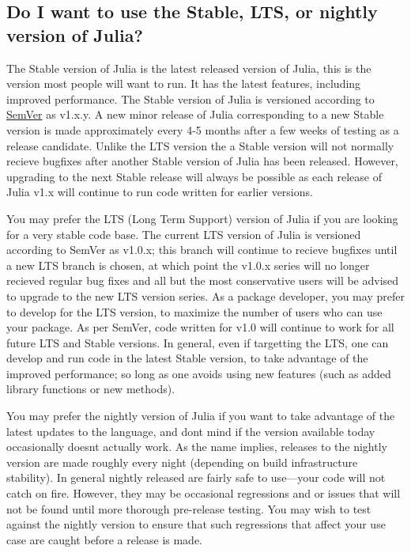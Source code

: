 \hypertarget{15044504752514653644}{}


\subsection{Do I want to use the Stable, LTS, or nightly version of Julia?}



The Stable version of Julia is the latest released version of Julia, this is the version most people will want to run. It has the latest features, including improved performance. The Stable version of Julia is versioned according to \href{https://semver.org/}{SemVer} as v1.x.y. A new minor release of Julia corresponding to a new Stable version is made approximately every 4-5 months after a few weeks of testing as a release candidate. Unlike the LTS version the a Stable version will not normally recieve bugfixes after another Stable version of Julia has been released. However, upgrading to the next Stable release will always be possible as each release of Julia v1.x will continue to run code written for earlier versions.



You may prefer the LTS (Long Term Support) version of Julia if you are looking for a very stable code base. The current LTS version of Julia is versioned according to SemVer as v1.0.x; this branch will continue to recieve bugfixes until a new LTS branch is chosen, at which point the v1.0.x series will no longer recieved regular bug fixes and all but the most conservative users will be advised to upgrade to the new LTS version series. As a package developer, you may prefer to develop for the LTS version, to maximize the number of users who can use your package. As per SemVer, code written for v1.0 will continue to work for all future LTS and Stable versions. In general, even if targetting the LTS, one can develop and run code in the latest Stable version, to take advantage of the improved performance; so long as one avoids using new features (such as added library functions or new methods).



You may prefer the nightly version of Julia if you want to take advantage of the latest updates to the language, and don{\textquotesingle}t mind if the version available today occasionally doesn{\textquotesingle}t actually work. As the name implies, releases to the nightly version are made roughly every night (depending on build infrastructure stability). In general nightly released are fairly safe to use—your code will not catch on fire. However, they may be occasional regressions and or issues that will not be found until more thorough pre-release testing. You may wish to test against the nightly version to ensure that such regressions that affect your use case are caught before a release is made.



